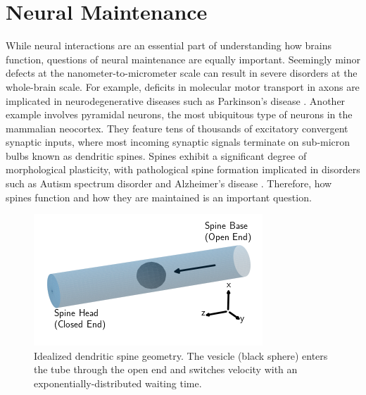 \documentclass[a4paper,11pt]{article}
\begin{document}
	
	\section{Neural Maintenance} \label{sec:maintenance}
	
    
    
	While neural interactions are an essential part of understanding how brains function, questions of neural maintenance are equally important. Seemingly minor defects at the nanometer-to-micrometer scale can result in severe disorders at the whole-brain scale. For example, deficits in molecular motor transport in axons are implicated in neurodegenerative diseases such as Parkinson's disease \cite{millecamps2013axonal}. Another example involves pyramidal neurons, the most ubiquitous type of neurons in the mammalian neocortex. They feature tens of thousands of excitatory convergent synaptic inputs, where most incoming synaptic signals terminate on sub-micron bulbs known as dendritic spines. Spines exhibit a significant degree of morphological plasticity, with pathological spine formation implicated in disorders such as Autism spectrum disorder and Alzheimer's disease \cite{penzes2011dendritic}. Therefore, how spines function and how they are maintained is an important question.
	
    \begin{figure}
        \centering
        \includegraphics[width=.5\textwidth]{figures/f_cylinder_sidways.png}
        \caption{Idealized dendritic spine geometry. The vesicle (black sphere) enters the tube through the open end and switches velocity with an exponentially-distributed waiting time.}
    \end{figure}
    
\end{document}
